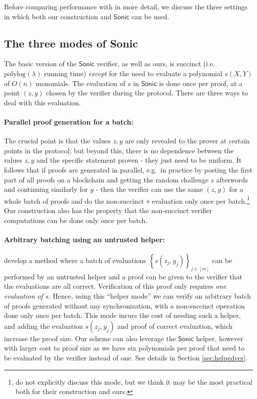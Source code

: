 \documentclass[11pt]{article}
\numberwithin{figure}{section} %
\newcommand{\set}[1]{\ensuremath{\left\{#1\right\}}\xspace}
\newcommand{\polylog}{\ensuremath{\mathrm{polylog}(\lambda)}\xspace}
\newcommand{\ariel}[1]{{\color{blue}{\textit{#1 --- ariel gabizon}}}}
\newcommand{\ariel}[1]{}
\newcommand{\sett}[2]{\ensuremath{\set{#1}_{#2}}\xspace}
\newcommand{\sonic}{\ensuremath{\mathsf{Sonic}}\xspace}
\begin{document}
Before comparing performance with \cite{sonic} in more detail, we discuss the three settings in which both our construction and \sonic can be used.
\subsection{The three modes of Sonic}\label{subsec:sonicmodes}
The basic version of the \sonic verifier, as well as ours, is succinct (i.e.\ \polylog running time)
\emph{except} for the need to evaluate a polynomial $s(X,Y)$ of $O(n)$ monomials.
The evaluation of $s$ in \sonic is done once per proof, at a point $(z,y)$ chosen by the verifier during the protocol.
There are three ways to deal with this evaluation.
\paragraph{Parallel proof generation for a batch:}
The crucial point is that the values $z,y$ are only revealed to the prover at certain points in the protocol; but beyond this, there is no dependence between the values $z,y$ and the specific statement proven - they just need to be uniform.
It follows that if proofs are generated in parallel, e.g.\ in practice by posting the first part of all proofs on a blockchain and getting the random challenge $z$ afterwords and continuing similarly for $y$ - then the verifier can use the same $(z,y)$ for a whole batch of proofs and do the non-succinct $s$ evaluation only once per batch.\footnote{\cite{sonic} do not explicitly discuss this mode, but we think it may be the most practical both for their construction and ours.}
Our construction also has the property that the non-succinct verifier computations can be done only once per batch.
\ariel{compute exact cost of computing $Q$}

\paragraph{Arbitrary batching using an untrusted helper:}
\cite{sonic} develop a method where a batch of evaluations \sett{s(z_j,y_j)}{j\in [m]}
can be performed by an untrusted helper and a proof can be given to the verifier that the evaluations are all correct. Verification of this proof only requires \emph{one evaluation of $s$}. Hence, using this ``helper mode'' we can verify an arbitrary batch of proofs generated without any synchronization, with a non-succinct operation done only once per batch. This mode incurs the cost of needing such a helper, and adding the evaluation $s(z_j,y_j)$ and proof of correct evaluation, which increase the proof size.
Our scheme can also leverage the \sonic helper, however with larger cost to proof size as we have six polynomials per proof that need to be evaluated by the verifier instead of one.
See details in Section \ref{sec:helpedver}.
\end{document}
